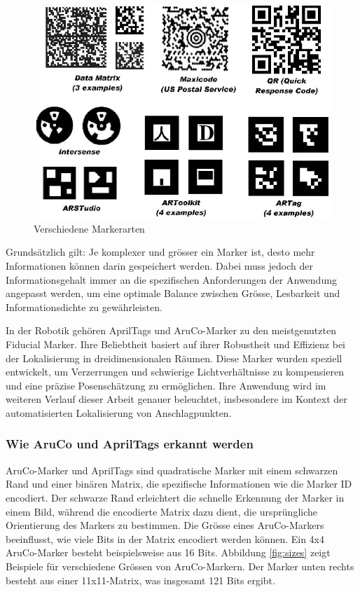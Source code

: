 \begin{figure}[H]
    \centering
    \includegraphics[width=0.7\linewidth]{graphics/marker_arten.png}
    \caption{Verschiedene Markerarten}
    \label{fig:marker_types}
\end{figure}

Grundsätzlich gilt: Je komplexer und grösser ein Marker ist, desto mehr Informationen können
darin gespeichert werden. Dabei muss jedoch der Informationsgehalt immer an die spezifischen 
Anforderungen der Anwendung angepasst werden, um eine optimale Balance zwischen Grösse, Lesbarkeit 
und Informationsdichte zu gewährleisten.

In der Robotik gehören AprilTags und AruCo-Marker zu den meistgenutzten Fiducial Marker. 
Ihre Beliebtheit basiert auf ihrer Robustheit und Effizienz bei der Lokalisierung in 
dreidimensionalen Räumen. Diese Marker wurden speziell entwickelt, um Verzerrungen und 
schwierige Lichtverhältnisse zu kompensieren und eine präzise Posenschätzung zu ermöglichen. 
Ihre Anwendung wird im weiteren Verlauf dieser Arbeit genauer beleuchtet, insbesondere im 
Kontext der automatisierten Lokalisierung von Anschlagpunkten.

\subsubsection {Wie AruCo und AprilTags erkannt werden}
AruCo-Marker und AprilTags sind quadratische Marker mit einem schwarzen Rand und einer binären Matrix, 
die spezifische Informationen wie die Marker ID encodiert. Der schwarze Rand erleichtert die schnelle Erkennung
der Marker in einem Bild, während die encodierte Matrix dazu dient, die ursprüngliche Orientierung
des Markers zu bestimmen. Die Grösse eines AruCo-Markers beeinflusst, wie viele Bits in der Matrix encodiert
werden können. Ein 4x4 AruCo-Marker besteht beispielsweise aus 16 Bits. Abbildung \ref{fig:sizes} zeigt 
Beispiele für verschiedene Grössen von AruCo-Markern. Der Marker unten rechts besteht aus einer 11x11-Matrix, 
was insgesamt 121 Bits ergibt.

